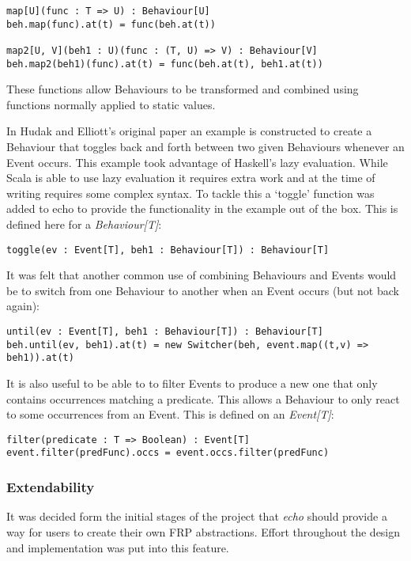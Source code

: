 \documentclass[12pt]{article}
\begin{document}
\begin{verbatim}
map[U](func : T => U) : Behaviour[U]
beh.map(func).at(t) = func(beh.at(t))

map2[U, V](beh1 : U)(func : (T, U) => V) : Behaviour[V]
beh.map2(beh1)(func).at(t) = func(beh.at(t), beh1.at(t))
\end{verbatim}        

        These functions allow Behaviours to be transformed and combined using functions
        normally applied to static values.
        
        In Hudak and Elliott's original paper an example is constructed to create a Behaviour
        that toggles back and forth between two given Behaviours whenever an Event occurs. This
        example took advantage of Haskell's lazy evaluation. While Scala is able to use lazy evaluation
        it requires extra work and at the time of writing requires some complex syntax. To tackle this
        a `toggle' function was added to echo to provide the functionality in the example out of the box.
        This is defined here for a \emph{Behaviour[T]}:
        
\begin{verbatim}
toggle(ev : Event[T], beh1 : Behaviour[T]) : Behaviour[T]
\end{verbatim}        
        
        It was felt that another common use of combining Behaviours and Events would be
        to switch from one Behaviour to another when an Event occurs (but not back again):

\begin{verbatim}
until(ev : Event[T], beh1 : Behaviour[T]) : Behaviour[T]
beh.until(ev, beh1).at(t) = new Switcher(beh, event.map((t,v) => beh1)).at(t)
\end{verbatim}        
        
        It is also useful to be able to to filter Events to produce a new one that only
        contains occurrences matching a predicate. This allows a Behaviour to only react
        to some occurrences from an Event. This is defined on an \emph{Event[T]}:
 
\begin{verbatim}
filter(predicate : T => Boolean) : Event[T]
event.filter(predFunc).occs = event.occs.filter(predFunc)
\end{verbatim}        
        
      \subsubsection{Extendability}
        It was decided form the initial stages of the project that \emph{echo} should provide
        a way for users to create their own FRP abstractions. Effort throughout the design and
        implementation was put into this feature.
        
\end{document}
